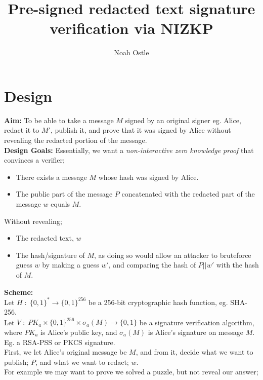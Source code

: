 \documentclass[]{article}
\title{Pre-signed redacted text signature verification via NIZKP}
\author{Noah Ostle}
\begin{document}
\maketitle

\newpage

\section{Design}
\textbf{Aim:} To be able to take a message $M$ signed by an original signer eg. Alice, redact it to $M'$, publish it, and prove that it was signed by Alice without revealing the redacted portion of the message.\\

\noindent \textbf{Design Goals:} Essentially, we want a \textit{non-interactive zero knowledge proof} that convinces a verifier;

\begin{itemize}
	\item There exists a message $M$ whose hash was signed by Alice.\
	\item The public part of the message $P$ concatenated with the redacted part of the message $w$ equals $M$.\\
\end{itemize}

\noindent Without revealing;
\begin{itemize}
	\item The redacted text, $w$\
	\item The hash/signature of $M$, as doing so would allow an attacker to bruteforce guess $w$ by making a guess $w'$, and comparing the hash of $P || w'$ with the hash of $M$.\\
\end{itemize}


\noindent \textbf{Scheme:}\\

Let $H\;:\; \{0,1\}^* \to \{0,1\}^{256}$ be a 256-bit cryptographic hash function, eg. SHA-256.\\

Let $V\;:\;PK_a \times \{0,1\}^{256}\times \sigma_a(M) \to \{0,1\}$ be a signature verification algorithm, where $PK_a$ is Alice's public key, and $\sigma_a(M)$ is Alice's signature on message $M$. Eg. a RSA-PSS or PKCS signature.\\

First, we let Alice's original message be $M$, and from it, decide what we want to publish; $P$, and what we want to redact; $w$.\\ For example we may want to prove we solved a puzzle, but not reveal our answer;
\end{document}
